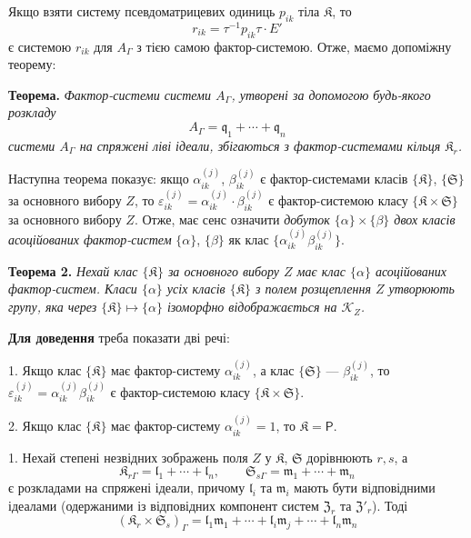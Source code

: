 \documentclass[11pt]{article}
\begin{document}
Якщо взяти систему псевдоматрицевих одиниць \(p_{ik}\) тіла \(\mathfrak K\), то
\[
r_{ik}=\tau^{-1}p_{ik}\tau\cdot E'
\]
є системою \(r_{ik}\) для \(A_\Gamma\) з тією самою фактор-системою. Отже, маємо допоміжну теорему:

\textbf{Теорема.} \emph{Фактор-системи системи \(A_\Gamma\), утворені за допомогою будь-якого розкладу}
\[
A_\Gamma=\mathfrak q_1+\cdots+\mathfrak q_n
\]
\emph{системи \(A_\Gamma\) на спряжені ліві ідеали, збігаються з фактор-системами кільця \(\mathfrak K_r\).}

Наступна теорема показує: якщо \(\alpha_{ik}^{(j)}\), \(\beta_{ik}^{(j)}\) є фактор-системами класів \(\{\mathfrak K\}\), \(\{\mathfrak S\}\) за основного вибору \(Z\), то \(\varepsilon_{ik}^{(j)}=\alpha_{ik}^{(j)}\cdot\beta_{ik}^{(j)}\) є фактор-системою класу \(\{\mathfrak K\times\mathfrak S\}\) за основного вибору \(Z\). Отже, має сенс означити \emph{добуток \(\{\alpha\}\times\{\beta\}\) двох класів асоційованих фактор-систем} \(\{\alpha\}\), \(\{\beta\}\) як клас \(\{\alpha_{ik}^{(j)}\beta_{ik}^{(j)}\}\).

\textbf{Теорема 2.} \emph{Нехай клас \(\{\mathfrak K\}\) за основного вибору \(Z\) має клас \(\{\alpha\}\) асоційованих фактор-систем. Класи \(\{\alpha\}\) усіх класів \(\{\mathfrak K\}\) з полем розщеплення \(Z\) утворюють групу, яка через \(\{\mathfrak K\}\mapsto\{\alpha\}\) ізоморфно відображається на \(\mathscr K_Z\).}

\textbf{Для доведення} треба показати дві речі:

1. Якщо клас \(\{\mathfrak K\}\) має фактор-систему \(\alpha_{ik}^{(j)}\), а клас \(\{\mathfrak S\}\) --- \(\beta_{ik}^{(j)}\), то \(\varepsilon_{ik}^{(j)}=\alpha_{ik}^{(j)}\beta_{ik}^{(j)}\) є фактор-системою класу \(\{\mathfrak K\times\mathfrak S\}\).

2. Якщо клас \(\{\mathfrak K\}\) має фактор-систему \(\alpha_{ik}^{(j)}=1\), то \(\mathfrak K=\mathsf P\).

1. Нехай степені незвідних зображень поля \(Z\) у \(\mathfrak K\), \(\mathfrak S\) дорівнюють \(r,s\), а
\[
\mathfrak K_{r\Gamma}=\mathfrak l_1+\cdots+\mathfrak l_n,\qquad
\mathfrak S_{s\Gamma}=\mathfrak m_1+\cdots+\mathfrak m_n
\]
є розкладами на спряжені ідеали, причому \(\mathfrak l_i\) та \(\mathfrak m_i\) мають бути відповідними ідеалами (одержаними із відповідних компонент систем \(\mathfrak Z_r\) та \(\mathfrak Z'_r\)). Тоді
\[
(\mathfrak K_r\times\mathfrak S_s)_\Gamma
=\mathfrak l_1\mathfrak m_1+\cdots+\mathfrak l_i\mathfrak m_j+\cdots+\mathfrak l_n\mathfrak m_n
\]
\end{document}
